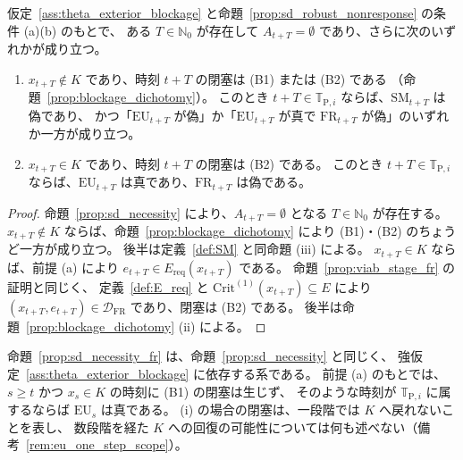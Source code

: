 \begin{proposition}[系：応答多様性縮退の持続と局所 FR]
\label{prop:sd_necessity_fr}
仮定~\ref{ass:theta_exterior_blockage} と命題~\ref{prop:sd_robust_nonresponse} の条件 (a)(b) のもとで、
ある $T\in\mathbb{N}_0$ が存在して $A_{t+T}=\emptyset$ であり、さらに次のいずれかが成り立つ。
\begin{enumerate}[label=(\roman*)]
  \item $x_{t+T}\notin K$ であり、時刻 $t+T$ の閉塞は (B1) または (B2) である
  （命題~\ref{prop:blockage_dichotomy}）。
  このとき $t+T\in\mathbb{T}_{\mathrm{P},i}$ ならば、$\mathrm{SM}_{t+T}$ は偽であり、
  かつ「$\mathrm{EU}_{t+T}$ が偽」か「$\mathrm{EU}_{t+T}$ が真で $\mathrm{FR}_{t+T}$ が偽」のいずれか一方が成り立つ。
  \item $x_{t+T}\in K$ であり、時刻 $t+T$ の閉塞は (B2) である。
  このとき $t+T\in\mathbb{T}_{\mathrm{P},i}$ ならば、$\mathrm{EU}_{t+T}$ は真であり、$\mathrm{FR}_{t+T}$ は偽である。
\end{enumerate}
\end{proposition}

\begin{proof}
命題~\ref{prop:sd_necessity} により、$A_{t+T}=\emptyset$ となる $T\in\mathbb{N}_0$ が存在する。
$x_{t+T}\notin K$ ならば、命題~\ref{prop:blockage_dichotomy} により (B1)・(B2) のちょうど一方が成り立つ。
後半は定義~\ref{def:SM} と同命題 (iii) による。
$x_{t+T}\in K$ ならば、前提 (a) により $e_{t+T}\in E_{\mathrm{req}}(x_{t+T})$ である。
命題~\ref{prop:viab_stage_fr} の証明と同じく、
定義~\ref{def:E_req} と $\mathrm{Crit}^{(1)}(x_{t+T})\subseteq E$ により
$(x_{t+T},e_{t+T})\in\mathcal{D}_{\mathrm{FR}}$ であり、閉塞は (B2) である。
後半は命題~\ref{prop:blockage_dichotomy} (ii) による。
\end{proof}

命題~\ref{prop:sd_necessity_fr} は、命題~\ref{prop:sd_necessity} と同じく、
強仮定~\ref{ass:theta_exterior_blockage} に依存する系である。
前提 (a) のもとでは、$s\ge t$ かつ $x_s\in K$ の時刻に (B1) の閉塞は生じず、
そのような時刻が $\mathbb{T}_{\mathrm{P},i}$ に属するならば $\mathrm{EU}_s$ は真である。
(i) の場合の閉塞は、一段階では $K$ へ戻れないことを表し、
数段階を経た $K$ への回復の可能性については何も述べない（備考~\ref{rem:eu_one_step_scope}）。

